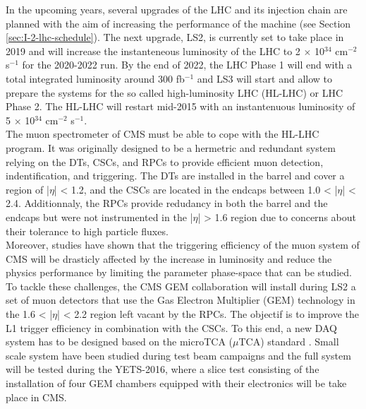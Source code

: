 In the upcoming years, several upgrades of the LHC and its injection chain are planned with the aim of increasing the performance of the machine (see Section \ref{sec:I-2-lhc-schedule}). The next upgrade, LS2, is currently set to take place in 2019 and will increase the instanteneous luminosity of the LHC to 2 $ \times $ 10$^{34}$ cm$^{-2}$ s$^{-1}$ for the 2020-2022 run. By the end of 2022, the LHC Phase 1 will end with a total integrated luminosity around 300 fb$^{-1}$ and LS3 will start and allow to prepare the systems for the so called high-luminosity LHC (HL-LHC) or LHC Phase 2. The HL-LHC will restart mid-2015 with an instantenuous luminosity of 5 $ \times $ 10$^{34}$ cm$^{-2}$ s$^{-1}$. \\

The muon spectrometer of CMS must be able to cope with the HL-LHC program. It was originally designed to be a hermetric and redundant system relying on the DTs, CSCs, and RPCs to provide efficient muon detection, indentification, and triggering. The DTs are installed in the barrel and cover a region of |$\eta$| < 1.2, and the CSCs are located in the endcaps between 1.0 < |$\eta$| < 2.4. Additionnaly, the RPCs provide redudancy in both the barrel and the endcaps but were not instrumented in the |$\eta$| > 1.6 region due to concerns about their tolerance to high particle fluxes. \\

Moreover, studies have shown that the triggering efficiency of the muon system of CMS will be drasticly affected by the increase in luminosity and reduce the physics performance by limiting the parameter phase-space that can be studied. \\

To tackle these challenges, the CMS GEM collaboration \cite{Colaleo:2021453} will install during LS2 a set of muon detectors that use the Gas Electron Multiplier (GEM) technology in the 1.6 < |$\eta$| < 2.2 region left vacant by the RPCs. The objectif is to improve the L1 trigger efficiency in combination with the CSCs. To this end, a new DAQ system has to be designed based on the microTCA ($\mu$TCA) standard \cite{PICMG}. Small scale system have been studied during test beam campaigns and the full system will be tested during the YETS-2016, where a slice test consisting of the installation of four GEM chambers equipped with their electronics will be take place in CMS. \\

